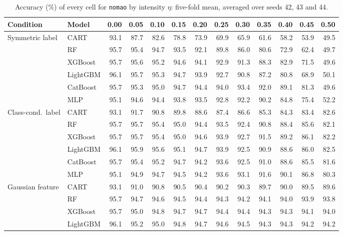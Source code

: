 \documentclass[pdflatex,sn-mathphys]{sn-jnl}
\theoremstyle{thmstyleone}
\begin{document}
\begin{table}[htbp]
\centering
\tiny
\setlength{\tabcolsep}{2.6pt}
\caption{Accuracy (\%) of every cell for \texttt{nomao} by intensity $\eta$: five-fold mean, averaged over seeds 42, 43 and 44.}
\label{tab:grid_nomao}
\begin{tabular}{@{}llrrrrrrrrrrr@{}}
\toprule
Condition & Model & 0.00 & 0.05 & 0.10 & 0.15 & 0.20 & 0.25 & 0.30 & 0.35 & 0.40 & 0.45 & 0.50 \\
\midrule
Symmetric label & CART & 93.1 & 87.7 & 82.6 & 78.8 & 73.9 & 69.9 & 65.9 & 61.6 & 58.2 & 53.9 & 49.5 \\
 & RF & 95.7 & 95.4 & 94.7 & 93.5 & 92.1 & 89.8 & 86.0 & 80.6 & 72.9 & 62.4 & 49.7 \\
 & XGBoost & 95.7 & 95.6 & 95.2 & 94.6 & 94.1 & 92.9 & 91.3 & 88.3 & 82.9 & 71.5 & 49.6 \\
 & LightGBM & 96.1 & 95.7 & 95.3 & 94.7 & 93.9 & 92.7 & 90.8 & 87.2 & 80.8 & 68.9 & 50.1 \\
 & CatBoost & 95.7 & 95.3 & 95.0 & 94.7 & 94.4 & 94.0 & 93.4 & 92.0 & 89.1 & 81.3 & 49.6 \\
 & MLP & 95.1 & 94.6 & 94.4 & 93.8 & 93.5 & 92.8 & 92.2 & 90.2 & 84.8 & 75.4 & 52.2 \\
\midrule
Class-cond.\ label & CART & 93.1 & 91.7 & 90.8 & 89.8 & 88.6 & 87.4 & 86.6 & 85.3 & 84.3 & 83.4 & 82.6 \\
 & RF & 95.7 & 95.7 & 95.4 & 95.0 & 94.4 & 93.5 & 92.4 & 90.8 & 88.4 & 85.6 & 82.1 \\
 & XGBoost & 95.7 & 95.7 & 95.4 & 95.0 & 94.6 & 93.9 & 92.7 & 91.5 & 89.2 & 86.1 & 82.2 \\
 & LightGBM & 96.1 & 95.9 & 95.6 & 95.1 & 94.7 & 93.9 & 92.5 & 90.9 & 88.6 & 86.0 & 82.5 \\
 & CatBoost & 95.7 & 95.4 & 95.2 & 94.7 & 94.2 & 93.6 & 92.5 & 91.0 & 88.6 & 85.5 & 81.6 \\
 & MLP & 95.1 & 94.9 & 94.7 & 94.5 & 94.2 & 93.6 & 93.1 & 91.6 & 90.1 & 86.8 & 80.3 \\
\midrule
Gaussian feature & CART & 93.1 & 91.0 & 90.8 & 90.5 & 90.4 & 90.2 & 90.3 & 89.7 & 90.0 & 89.5 & 89.6 \\
 & RF & 95.7 & 94.7 & 94.6 & 94.5 & 94.4 & 94.3 & 94.2 & 94.1 & 94.0 & 93.9 & 93.8 \\
 & XGBoost & 95.7 & 95.0 & 94.8 & 94.7 & 94.7 & 94.4 & 94.4 & 94.3 & 94.3 & 94.1 & 94.0 \\
 & LightGBM & 96.1 & 95.2 & 95.0 & 94.8 & 94.7 & 94.6 & 94.5 & 94.3 & 94.3 & 94.2 & 94.2 \\

\end{tabular}
\end{table}
\end{document}
